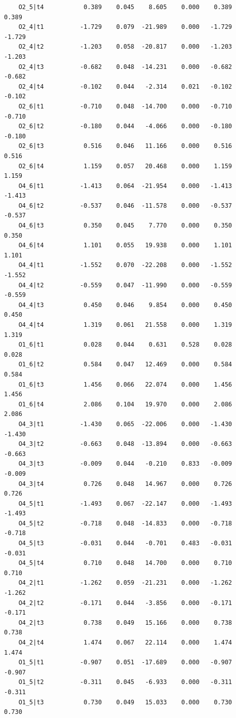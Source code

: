 \documentclass[
  letterpaper,
  DIV=11,
  numbers=noendperiod]{scrartcl}
\begin{document}
\begin{verbatim}
    O2_5|t4           0.389    0.045    8.605    0.000    0.389    0.389
    O2_4|t1          -1.729    0.079  -21.989    0.000   -1.729   -1.729
    O2_4|t2          -1.203    0.058  -20.817    0.000   -1.203   -1.203
    O2_4|t3          -0.682    0.048  -14.231    0.000   -0.682   -0.682
    O2_4|t4          -0.102    0.044   -2.314    0.021   -0.102   -0.102
    O2_6|t1          -0.710    0.048  -14.700    0.000   -0.710   -0.710
    O2_6|t2          -0.180    0.044   -4.066    0.000   -0.180   -0.180
    O2_6|t3           0.516    0.046   11.166    0.000    0.516    0.516
    O2_6|t4           1.159    0.057   20.468    0.000    1.159    1.159
    O4_6|t1          -1.413    0.064  -21.954    0.000   -1.413   -1.413
    O4_6|t2          -0.537    0.046  -11.578    0.000   -0.537   -0.537
    O4_6|t3           0.350    0.045    7.770    0.000    0.350    0.350
    O4_6|t4           1.101    0.055   19.938    0.000    1.101    1.101
    O4_4|t1          -1.552    0.070  -22.208    0.000   -1.552   -1.552
    O4_4|t2          -0.559    0.047  -11.990    0.000   -0.559   -0.559
    O4_4|t3           0.450    0.046    9.854    0.000    0.450    0.450
    O4_4|t4           1.319    0.061   21.558    0.000    1.319    1.319
    O1_6|t1           0.028    0.044    0.631    0.528    0.028    0.028
    O1_6|t2           0.584    0.047   12.469    0.000    0.584    0.584
    O1_6|t3           1.456    0.066   22.074    0.000    1.456    1.456
    O1_6|t4           2.086    0.104   19.970    0.000    2.086    2.086
    O4_3|t1          -1.430    0.065  -22.006    0.000   -1.430   -1.430
    O4_3|t2          -0.663    0.048  -13.894    0.000   -0.663   -0.663
    O4_3|t3          -0.009    0.044   -0.210    0.833   -0.009   -0.009
    O4_3|t4           0.726    0.048   14.967    0.000    0.726    0.726
    O4_5|t1          -1.493    0.067  -22.147    0.000   -1.493   -1.493
    O4_5|t2          -0.718    0.048  -14.833    0.000   -0.718   -0.718
    O4_5|t3          -0.031    0.044   -0.701    0.483   -0.031   -0.031
    O4_5|t4           0.710    0.048   14.700    0.000    0.710    0.710
    O4_2|t1          -1.262    0.059  -21.231    0.000   -1.262   -1.262
    O4_2|t2          -0.171    0.044   -3.856    0.000   -0.171   -0.171
    O4_2|t3           0.738    0.049   15.166    0.000    0.738    0.738
    O4_2|t4           1.474    0.067   22.114    0.000    1.474    1.474
    O1_5|t1          -0.907    0.051  -17.689    0.000   -0.907   -0.907
    O1_5|t2          -0.311    0.045   -6.933    0.000   -0.311   -0.311
    O1_5|t3           0.730    0.049   15.033    0.000    0.730    0.730

\end{verbatim}
\end{document}
